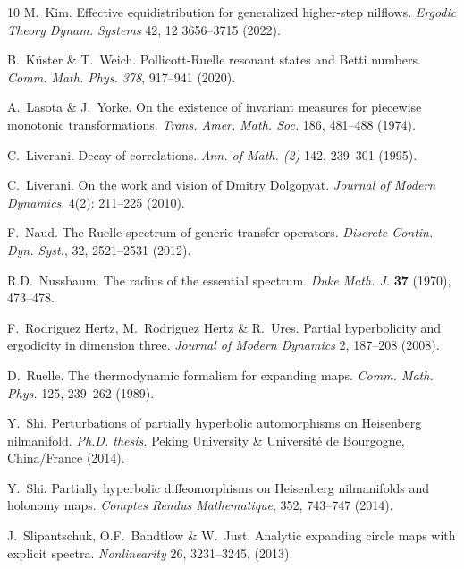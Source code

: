 \documentclass[a4paper,11pt]{amsart}
\theoremstyle{remark}
\begin{document}
\begin{thebibliography}{10}
    M.~Kim. 
    Effective equidistribution for generalized higher-step nilflows.
    \emph{Ergodic Theory Dynam. Systems} 42, 12 3656--3715 (2022).

    B.~Küster \& T.~Weich.
    Pollicott-Ruelle resonant states and Betti numbers.
    \emph{Comm. Math. Phys. 378}, 917--941 (2020).

    A.~Lasota \& J.~Yorke.
    On the existence of invariant measures for piecewise monotonic transformations.
    \emph{Trans. Amer. Math. Soc.} 186, 481--488 (1974).

    C.~Liverani.
    Decay of correlations.
    \emph{Ann. of Math. (2)} 142, 239--301 (1995).

    C.~Liverani.
    On the work and vision of Dmitry Dolgopyat. 
    \emph{Journal of Modern Dynamics}, 4(2): 211--225 (2010). 

    F.~Naud.
    The Ruelle spectrum of generic transfer operators.
    {\em Discrete Contin. Dyn. Syst.}, 32, 2521--2531 (2012).

    R.D.~Nussbaum.
    {The radius of the essential spectrum}.
    \emph{Duke Math. J.} {\bf 37} (1970), 473--478.

    F.~Rodriguez Hertz, M.~Rodriguez Hertz \& R.~Ures. Partial hyperbolicity and ergodicity in dimension three. 
    \emph{Journal of Modern Dynamics} 2, 187--208 (2008).

    D.~Ruelle.
    The thermodynamic formalism for expanding maps.
    \emph{Comm. Math. Phys.} 125, 239--262 (1989).

    Y.~Shi.
    Perturbations of partially hyperbolic automorphisms on Heisenberg nilmanifold.
    \emph{Ph.D. thesis.}
    Peking University \& Université de Bourgogne, China/France (2014).

    Y.~Shi.
    Partially hyperbolic diffeomorphisms on Heisenberg nilmanifolds and holonomy maps.
    \emph{Comptes Rendus Mathematique}, 352, 743--747 (2014).

    J.~Slipantschuk, O.F.~Bandtlow \& W.~Just.
    \newblock Analytic expanding circle maps with explicit spectra.
    \emph{Nonlinearity} 26, 3231--3245, (2013).


\end{thebibliography}
\end{document}

